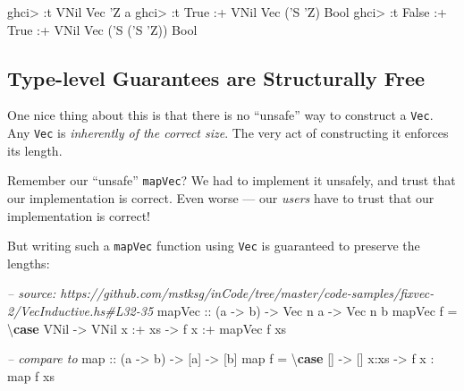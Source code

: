 \documentclass[]{article}
\newenvironment{Shaded}{}{}
\newcommand{\KeywordTok}[1]{\textcolor[rgb]{0.00,0.44,0.13}{\textbf{#1}}}
\newcommand{\DataTypeTok}[1]{\textcolor[rgb]{0.56,0.13,0.00}{#1}}
\newcommand{\CharTok}[1]{\textcolor[rgb]{0.25,0.44,0.63}{#1}}
\newcommand{\CommentTok}[1]{\textcolor[rgb]{0.38,0.63,0.69}{\textit{#1}}}
\newcommand{\OtherTok}[1]{\textcolor[rgb]{0.00,0.44,0.13}{#1}}
\newcommand{\FunctionTok}[1]{\textcolor[rgb]{0.02,0.16,0.49}{#1}}
\newcommand{\NormalTok}[1]{#1}
\begin{document}
\begin{Shaded}
\begin{Highlighting}[]
\NormalTok{ghci}\FunctionTok{>} \FunctionTok{:}\NormalTok{t }\DataTypeTok{VNil}
\DataTypeTok{Vec} \CharTok{'Z a}
\NormalTok{ghci}\FunctionTok{>} \FunctionTok{:}\NormalTok{t }\DataTypeTok{True} \FunctionTok{:+} \DataTypeTok{VNil}
\DataTypeTok{Vec}\NormalTok{ (}\CharTok{'S '}\DataTypeTok{Z}\NormalTok{) }\DataTypeTok{Bool}
\NormalTok{ghci}\FunctionTok{>} \FunctionTok{:}\NormalTok{t }\DataTypeTok{False} \FunctionTok{:+} \DataTypeTok{True} \FunctionTok{:+} \DataTypeTok{VNil}
\DataTypeTok{Vec}\NormalTok{ (}\CharTok{'S ('}\DataTypeTok{S} \CharTok{'Z)) Bool}
\end{Highlighting}
\end{Shaded}

\subsection{Type-level Guarantees are Structurally
Free}\label{type-level-guarantees-are-structurally-free}

One nice thing about this is that there is no ``unsafe'' way to construct a
\texttt{Vec}. Any \texttt{Vec} is \emph{inherently of the correct size}. The
very act of constructing it enforces its length.

Remember our ``unsafe'' \texttt{mapVec}? We had to implement it unsafely, and
trust that our implementation is correct. Even worse --- our \emph{users} have
to trust that our implementation is correct!

But writing such a \texttt{mapVec} function using \texttt{Vec} is guaranteed to
preserve the lengths:

\begin{Shaded}
\begin{Highlighting}[]
\CommentTok{-- source: https://github.com/mstksg/inCode/tree/master/code-samples/fixvec-2/VecInductive.hs#L32-35}
\OtherTok{mapVec ::}\NormalTok{ (a }\OtherTok{->}\NormalTok{ b) }\OtherTok{->} \DataTypeTok{Vec}\NormalTok{ n a }\OtherTok{->} \DataTypeTok{Vec}\NormalTok{ n b}
\NormalTok{mapVec f }\FunctionTok{=}\NormalTok{ \textbackslash{}}\KeywordTok{case}
    \DataTypeTok{VNil}    \OtherTok{->} \DataTypeTok{VNil}
\NormalTok{    x }\FunctionTok{:+}\NormalTok{ xs }\OtherTok{->}\NormalTok{ f x }\FunctionTok{:+}\NormalTok{ mapVec f xs}

\CommentTok{-- compare to}
\NormalTok{map}\OtherTok{ ::}\NormalTok{ (a }\OtherTok{->}\NormalTok{ b) }\OtherTok{->}\NormalTok{ [a] }\OtherTok{->}\NormalTok{ [b]}
\NormalTok{map f }\FunctionTok{=}\NormalTok{ \textbackslash{}}\KeywordTok{case}
\NormalTok{    [] }\OtherTok{->}\NormalTok{ []}
\NormalTok{    x}\FunctionTok{:}\NormalTok{xs }\OtherTok{->}\NormalTok{ f x }\FunctionTok{:}\NormalTok{ map f xs}
\end{Highlighting}
\end{Shaded}
\end{document}
